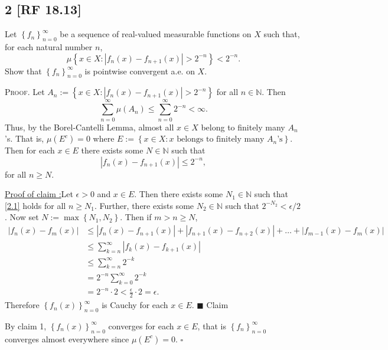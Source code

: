 \documentclass[12pt]{article}
\newcounter{ProofCounter}
\newcounter{ClaimCounter}[ProofCounter]
\newenvironment{Proof}{\stepcounter{ProofCounter}\textsc{Proof.}}{\hfill$\square$}
\newenvironment{claim}[1]{\vspace{1mm}\stepcounter{ClaimCounter}\par\noindent\underline{\bf Claim \theClaimCounter:}\space#1}{}
\newenvironment{claimproof}[1]{\par\noindent\underline{Proof of claim \theClaimCounter:}\space#1}{\hfill $\blacksquare$ Claim \theClaimCounter}
\begin{document}
\subsection*{2 [RF 18.13]}
\begin{tcolorbox}
Let $\left\{ f_n \right\}_{n=0}^{\infty}$ be a sequence of real-valued measurable functions on $X$ such that, for each natural number $n$, 
\[ \mu\left\{ x \in X : |f_{n}(x) - f_{n+1}(x)| > 2^{-n} \right\} < 2^{-n}. \]
Show that $\left\{ f_{n} \right\}_{n=0}^{\infty}$ is pointwise convergent a.e. on $X$.
\end{tcolorbox}
\begin{Proof}
Let $A_{n} := \left\{ x \in X : |f_{n}(x) - f_{n+1}(x)| > 2^{-n} \right\}$ for all $n \in \mathbb{N}$. Then 
\[ \sum_{n=0}^{\infty}\mu(A_{n}) \leq \sum_{n=0}^{\infty}2^{-n} < \infty. \]
Thus, by the Borel-Cantelli Lemma, almost all $x \in X$ belong to finitely many $A_{n}$'s. That is, $\mu(E^{c}) = 0$ where $E := \left\{ 
x \in X : x \text{ belongs to finitely many $A_{n}$'s}\right\}$. Then for each $x \in E$ there exists some $N \in \mathbb{N}$ such that  
\begin{equation}
|f_{n}(x) - f_{n+1}(x)| \leq 2^{-n}, 
\label{2.1}
\end{equation}
for all $n \geq N$.
\begin{claimproof}
Let $\epsilon > 0$ and $x \in E$. Then there exists some $N_{1} \in \mathbb{N}$ such that \eqref{2.1} holds for all $n \geq N_{1}$. Further, there exists some
$N_{2} \in \mathbb{N}$ such that $2^{-N_{2}} < \epsilon / 2$. Now set $N := \max\left\{ N_{1},N_{2} \right\}$. Then if $m > n \geq N$,
\begin{align*}
|f_{n}(x) - f_{m}(x)| & \leq |f_{n}(x) - f_{n+1}(x)| + |f_{n+1}(x) - f_{n+2}(x)| + \dots + |f_{m-1}(x) - f_{m}(x)|  \\
& \leq \sum_{k=n}^{\infty}|f_{k}(x) - f_{k+1}(x)| \\
& \leq \sum_{k=n}^{\infty}2^{-k} \\
& = 2^{-n}\sum_{k=0}^{\infty}2^{-k} \\
& = 2^{-n}\cdot 2 < \frac{\epsilon}{2} \cdot 2 = \epsilon.
\end{align*}
Therefore $\left\{ f_{n}(x) \right\}_{n=0}^{\infty}$ is Cauchy for each $x \in E$.
\end{claimproof}

By claim 1, $\left\{ f_{n}(x) \right\}_{n=0}^{\infty}$ converges for each $x \in E$, that is $\left\{ f_{n} \right\}_{n=0}^{\infty}$ converges almost
everywhere since $\mu(E^{c}) = 0$.
\end{Proof}
\end{document}
